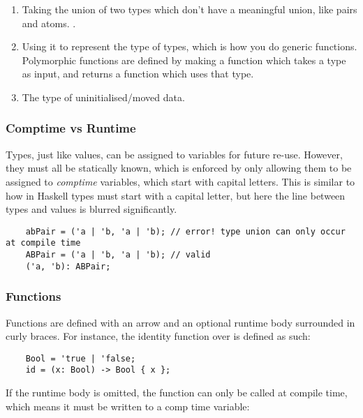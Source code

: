 \documentclass[12pt,twoside]{report}
\begin{document}
\begin{enumerate}
  \item Taking the union of two types which don't have a meaningful union, like pairs and atoms. .
  \item Using it to represent the type of types, which is how you do generic functions. Polymorphic functions are defined by making a function which takes a type as input, and returns a function which uses that type.
  \item The type of uninitialised/moved data.
\end{enumerate}

\subsubsection{Comptime vs Runtime}

Types, just like values, can be assigned to variables for future re-use. However, they must all be statically known, which is enforced by only allowing them to be assigned to \textit{comptime} variables, which start with capital letters. This is similar to how in Haskell types must start with a capital letter, but here the line between types and values is blurred significantly.

  \begin{verbatim}
    abPair = ('a | 'b, 'a | 'b); // error! type union can only occur at compile time
    ABPair = ('a | 'b, 'a | 'b); // valid
    ('a, 'b): ABPair;
  \end{verbatim}

\subsubsection{Functions}
Functions are defined with an arrow \mono{->} and an optional runtime body surrounded in curly braces. For instance, the identity function over  is defined as such:

  \begin{verbatim}
    Bool = 'true | 'false;
    id = (x: Bool) -> Bool { x };
  \end{verbatim}

If the runtime body is omitted, the function can only be called at compile time, which means it must be written to a comp time variable:
\end{document}
